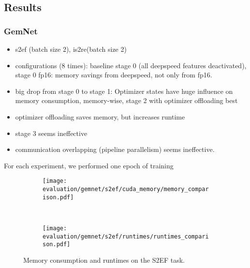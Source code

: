 \subsection{Results}

\subsubsection{GemNet}

\begin{itemize}
    \item s2ef (batch size 2), is2re(batch size 2)
    \item configurations (8 times): baseline stage 0 (all deepspeed features deactivated), 
    stage 0 fp16: memory savings from deepspeed, not only from fp16. 
    \item big drop from stage 0 to stage 1: Optimizer states have huge influence on
    memory consumption, memory-wise, stage 2 with optimizer offloading best
    \item optimizer offloading saves memory, but increases runtime
    \item stage 3 seems ineffective
    \item communication overlapping (pipeline parallelism) seems ineffective.
\end{itemize}

For each experiment, we performed one epoch of training

\begin{figure}[H]
    \centering

    \begin{subfigure}[t]{0.48\textwidth}
        \centering
        \texttt{[image: evaluation/gemnet/s2ef/cuda\_memory/memory\_comparison.pdf]}
        \label{fig:gemnet-s2ef-memory-results}
    \end{subfigure}%
    ~
    \begin{subfigure}[t]{0.48\textwidth}
        \centering
        \texttt{[image: evaluation/gemnet/s2ef/runtimes/runtimes\_comparison.pdf]}
        \label{gemnet-s2ef-runtimes-results}
    \end{subfigure}
    \vspace*{-1.5em}
    \caption{Memory consumption and runtimes on the S2EF task.}
    
\end{figure}

